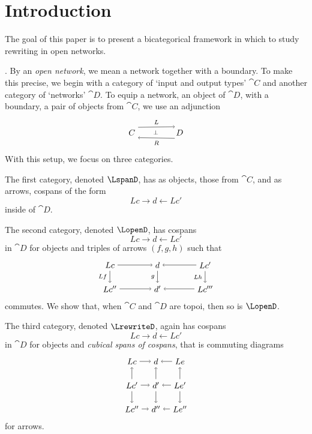 \documentclass[reopn_master]{subfiles}
\begin{document}
 

\section{Introduction}


The goal of this paper is to present a bicategorical framework in which to study rewriting in open networks.


.  By an \emph{open network},
we mean a network together with a boundary.
To make this precise, we
begin with a category of `input and output types' 
$\cat{C}$
and another category of `networks' 
$ \cat{D} $.
To equip a network, an object of $\cat{D}$,
with a boundary, a pair of objects from $\cat{C}$,
we use an adjunction
\[ %
\begin{tikzpicture} 
\node (C) at (0,0) {$ C $};
\node (D) at (2,0) {$ D $};
\node at (1,0) {\scriptsize $ \perp $};
\draw [->] (C.40) to 
node [above] {\scriptsize $ L $} (D.130);
\draw [<-] (C.-40) to 
node [below] {\scriptsize $ R $} (D.-130);
\end{tikzpicture}
\]
With this setup, we focus on three categories.

The first category, denoted 
$ \LspanD $,
has as objects, those from $ \cat{C} $,
and as arrows, cospans of the form
\[
Lc \to d \gets Lc'
\]
inside of $ \cat{D} $. 

The second category, denoted
$ \LopenD $,
has cospans
\[
Lc \to d \gets Lc'
\]
in $ \cat{ D } $ for objects and
triples of arrows $ ( f , g , h ) $
such that 
\[  %
\begin{tikzpicture}
\node (Lc) at (-2,1) {$ Lc $};
\node (d) at (0,1) {$ d $};
\node (Lc') at (2,1) {$ Lc' $};
\node (Lc'') at (-2,0) {$ Lc'' $};
\node (d') at (0,0) {$ d' $};
\node (Lc''') at (2,0) {$ Lc''' $};
\draw [->] (Lc) to (d);
\draw [->] (Lc') to (d);
\draw [->] (Lc'') to (d');
\draw [->] (Lc''') to (d');
\draw [->] (Lc) to node [left] {\scriptsize $ Lf $ } (Lc'');
\draw [->] (d) to node [left] { \scriptsize $ g $ }(d');
\draw [->] (Lc') to node [left] { \scriptsize $ Lh $ }(Lc''');
\end{tikzpicture}
\]
commutes.
We show that, when $ \cat{C} $ and
$ \cat{D} $ are topoi, then so is $ \LopenD $.

The third category, denoted
$ \LrewriteD $,
again has cospans 
\[
Lc \to d \gets Lc'
\]
in $ \cat{D} $ for objects and
\emph{cubical spans of cospans}, that is
commuting diagrams 
\[ %
\begin{tikzpicture}
\node (Lc) at (-1,1) {$ Lc $};
\node (Lc') at (-1,0) {$ Lc' $};
\node (Lc'') at (-1,-1) {$ Lc'' $};
\node (d) at (0,1) {$ d $};
\node (d') at (0,0) {$ d' $};
\node (d'') at (0,-1) {$ d'' $};
\node (Le) at (1,1) {$ Le $};
\node (Le') at (1,0) {$ Le' $};
\node (Le'') at (1,-1) {$ Le'' $};
\draw [->] (Lc) to (d);
\draw [->] (Le) to (d);
\draw [->] (Lc') to (d');
\draw [->] (Le') to (d');
\draw [->] (Lc'') to (d'');
\draw [->] (Le'') to (d'');
\draw [->] (Lc') to (Lc);
\draw [->] (Lc') to (Lc'');
\draw [->] (d') to (d);
\draw [->] (d') to (d'');
\draw [->] (Le') to (Le);
\draw [->] (Le') to (Le'');
\end{tikzpicture}
\]
for arrows.  
\end{document}
